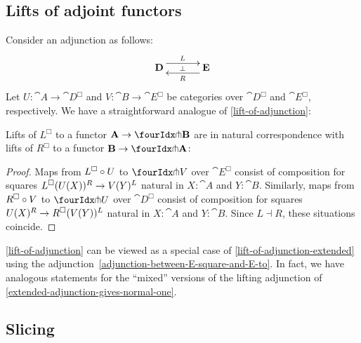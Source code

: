 \documentclass[reqno,10pt,a4paper,oneside]{amsart}
\begin{document}
\subsection{Lifts of adjoint functors}

Consider an adjunction as follows:
\[
\xymatrix@C+1em{
  \cat{D}
  \ar@<5pt>[r]^{L}
  \ar@{}[r]|{\bot}
&
  \cat{E}
  \ar@<5pt>[l]^{R}
}
\]
Let $U : \cat{A} \to \cat{D}^{\Box}$ and $V : \cat{B} \to \cat{E}^{\Box}$ be categories over $\cat{D}^{\Box}$ and $\cat{E}^{\Box}$, respectively.
We have a straightforward analogue of \cref{lift-of-adjunction}:

\begin{lemma}
\label{lift-of-adjunction-extended}
Lifts of $L^{\Box}$ to a functor $\cat{A} \to \liftl{\cat{B}}$ are in natural correspondence with lifts of $R^{\Box}$ to a functor $\cat{B} \to \liftr{\cat{A}}$:
\end{lemma}

\begin{proof}
Maps from $L^{\Box} \mathbin{\circ} U$ to $\liftl{V}$ over $\cat{E}^{\Box}$ consist of composition for squares $L^{\Box}(U(X)){}^R \to V(Y){}^L$ natural in $X : \cat{A}$ and $Y : \cat{B}$.
Similarly, maps from $R^{\Box} \mathbin{\circ} V$ to $\liftr{U}$ over $\cat{D}^{\Box}$ consist of composition for squares $U(X){}^R \to R^{\Box}(V(Y)){}^L$ natural in $X : \cat{A}$ and $Y : \cat{B}$.
Since $L \dashv R$, these situations coincide.
\end{proof}

\begin{remark}
\label{lift-of-adjunction-mixed}
\cref{lift-of-adjunction} can be viewed as a special case of \cref{lift-of-adjunction-extended} using the adjunction~\eqref{adjunction-between-E-square-and-E-to}.
In fact, we have analogous statements for the ``mixed'' versions of the lifting adjunction of \cref{extended-adjunction-gives-normal-one}.
\end{remark}

\subsection{Slicing}
\end{document}
